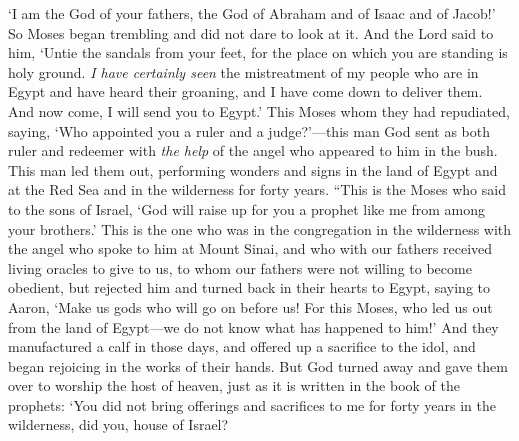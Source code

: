 \begin{biblechapter}
\verse ‘I am the God of your fathers, the God of Abraham and of Isaac and of Jacob!’ So Moses began trembling and did not dare to look at it.
\verse And the Lord said to him, ‘Untie the sandals from your feet, for the place on which you are standing is holy ground.
\verse \textit{I have certainly seen} the mistreatment of my people who are in Egypt and have heard their groaning, and I have come down to deliver them. And now come, I will send you to Egypt.’
\verse This Moses whom they had repudiated, saying, ‘Who appointed you a ruler and a judge?’—this man God sent as both ruler and redeemer with \textit{the help} of the angel who appeared to him in the bush.
\verse This man led them out, performing wonders and signs in the land of Egypt and at the Red Sea and in the wilderness for forty years.
\verse “This is the Moses who said to the sons of Israel, ‘God will raise up for you a prophet like me from among your brothers.’
\verse This is the one who was in the congregation in the wilderness with the angel who spoke to him at Mount Sinai, and who with our fathers received living oracles to give to us,
\verse to whom our fathers were not willing to become obedient, but rejected him and turned back in their hearts to Egypt,
\verse saying to Aaron, ‘Make us gods who will go on before us! For this Moses, who led us out from the land of Egypt—we do not know what has happened to him!’
\verse And they manufactured a calf in those days, and offered up a sacrifice to the idol, and began rejoicing in the works of their hands.
\verse But God turned away and gave them over to worship the host of heaven, just as it is written in the book of the prophets:
\verse ‘You did not bring offerings and sacrifices to me 
for forty years in the wilderness, did you, house of Israel?

\end{biblechapter}
